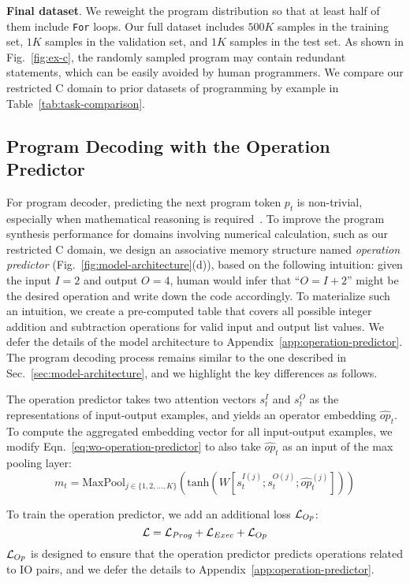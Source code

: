 \textbf{Final dataset}. We reweight the program distribution so that at least half of them include \texttt{For} loops. Our full dataset includes $500K$ samples in the training set, $1K$ samples in the validation set, and $1K$ samples in the test set. As shown in Fig.~\ref{fig:ex-c}, the randomly sampled program may contain redundant statements, which can be easily avoided by human programmers. We compare our restricted C domain to prior datasets of programming by example in Table~\ref{tab:task-comparison}.

\subsection{Program Decoding with the Operation Predictor}
\vspace{-0.1in}
For program decoder, predicting the next program token $p_t$ is non-trivial, especially when mathematical reasoning is required~\cite{saxton2019analysing,lample2019deep}. To improve the program synthesis performance for domains involving numerical calculation, such as our restricted C domain, we design an associative memory structure named \emph{operation predictor} (Fig.~\ref{fig:model-architecture}(d)), based on the following intuition: given the input $I=2$ and output $O=4$, human would infer that ``$O=I+2$'' might be the desired operation and write down the code accordingly. To materialize such an intuition, we create a pre-computed table that covers all possible integer addition and subtraction operations for valid input and output list values. We defer the details of the model architecture to Appendix~\ref{app:operation-predictor}. The program decoding process remains similar to the one described in Sec.~\ref{sec:model-architecture}, and we highlight the key differences as follows. 

The operation predictor takes two attention vectors $s_t^I$ and $s_t^O$ as the representations of input-output examples, and yields an operator embedding $\hat{op}_t$. To compute the aggregated embedding vector for all input-output examples, we modify Eqn.~\ref{eq:wo-operation-predictor} to also take $\hat{op}_t$ as an input of the max pooling layer:
\begin{equation}
m_t=\mathrm{MaxPool}_{j \in \{1,2,...,K\}}(\mathrm{tanh}(W[s_t^{I(j)}; s_t^{O(j)}; \hat{op}_t^{(j)}])) \label{eq:with-operation-predictor}
\end{equation}

To train the operation predictor, we add an additional loss $\mathcal{L}_{Op}$: 
\begin{equation}
\mathcal{L}=\mathcal{L}_{Prog} + \mathcal{L}_{Exec} + \mathcal{L}_{Op}
\end{equation}
$\mathcal{L}_{Op}$ is designed to ensure that the operation predictor predicts operations related to IO pairs, and we defer the details to Appendix~\ref{app:operation-predictor}.

